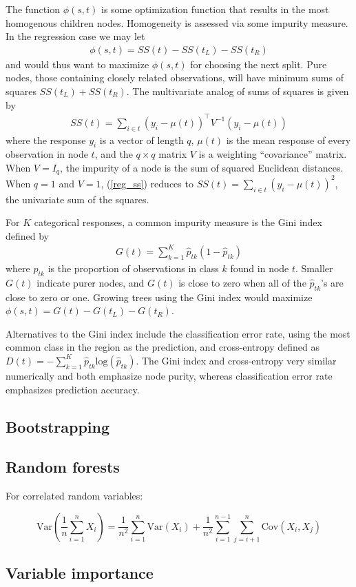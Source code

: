 The function $\phi(s, t)$ is some optimization function that results in the most homogenous children nodes. Homogeneity is assessed via some impurity measure. In the regression case we may let
\begin{eqnarray}
\phi(s, t) = SS(t) - SS(t_L) - SS(t_R)
\label{reg_phi}
\end{eqnarray}
and would thus want to maximize $\phi(s, t)$ for choosing the next split. Pure nodes, those containing closely related observations, will have minimum sums of squares $SS(t_L) + SS(t_R)$. The multivariate analog of sums of squares is given by
\begin{eqnarray}
SS(t) = \sum_{i\in t}(y_i-\mu(t))^\top V^{-1} (y_i-\mu(t))
\label{reg_ss}
\end{eqnarray}
where the response $y_i$ is a vector of length $q$, $\mu(t)$ is the mean response of every observation in node $t$, and the $q\times q$ matrix $V$ is a weighting ``covariance'' matrix. When $V=I_q$, the impurity of a node is the sum of squared Euclidean distances. When $q=1$ and $V=1$, (\ref{reg_ss}) reduces to $SS(t) = \sum_{i\in t}(y_i-\mu(t))^2$, the univariate sum of the squares.

For $K$ categorical responses, a common impurity measure is the Gini index defined by
\begin{eqnarray}
G(t) = \sum_{k=1}^K\hat{p}_{tk}(1-\hat{p}_{tk})
\label{cla_gini}
\end{eqnarray}
where $\hat{p}_{tk}$ is the proportion of observations in class $k$ found in node $t$. Smaller $G(t)$ indicate purer nodes, and $G(t)$ is close to zero when all of the $\hat{p}_{tk}$'s are close to zero or one. Growing trees using the Gini index would maximize $\phi(s, t)=G(t) - G(t_L) - G(t_R)$.

Alternatives to the Gini index include the classification error rate, using the most common class in the region as the prediction, and cross-entropy defined as $D(t) = -\sum_{k=1}^K\hat{p}_{tk}\mathrm{log}(\hat{p}_{tk})$. The Gini index and cross-entropy very similar numerically and both emphasize node purity, whereas classification error rate emphasizes prediction accuracy.




\subsection{Bootstrapping}


\subsection{Random forests}

For correlated random variables:

\[ \mathrm{Var}\left(\frac{1}{n}\sum_{i=1}^nX_i\right) = \frac{1}{n^2}\sum_{i=1}^n\mathrm{Var}(X_i) + \frac{1}{n^2}\sum_{i=1}^{n-1}\sum_{j=i+1}^n\mathrm{Cov}(X_i,X_j) \]

\subsection{Variable importance}

